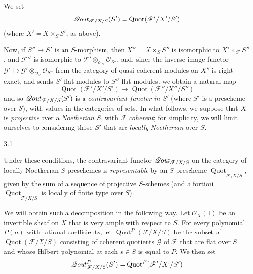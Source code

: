   We set
  \[     \mathscr {Q}\kern  -.75pt\mathit {out}_{{\mathscr {F}/X/S}} (S')     = \operatorname {Quot}({\mathscr {F}'/X'/S'})   \]
  (where \(X'=X\times _S S'\), as above).\par{}Now, if \(S''\to  S'\) is an \(S\)-morphism, then \(X''=X\times _S S''\) is isomorphic to \(X'\times _{S'}S''\), and \(\mathscr {F}''\) is isomorphic to \(\mathscr {F}'\otimes _{\mathcal {O}_{S'}}\mathcal {O}_{S''}\), and, since the inverse image functor \(\mathscr {G}'\mapsto \mathscr {G}'\otimes _{\mathcal {O}_{S'}}\mathcal {O}_{S''}\) from the category of quasi-coherent modules on \(X''\) is right exact, and sends \(S'\)-flat modules to \(S''\)-flat modules, we obtain a natural map
  \[     \operatorname {Quot}({\mathscr {F}'/X'/S'}) \to  \operatorname {Quot}(\mathscr {F}''/X''/S'')   \]
  and so \(\mathscr {Q}\kern  -.75pt\mathit {out}_{{\mathscr {F}/X/S}} (S')\) is a \emph{contravariant functor in \(S'\)} (where \(S'\) is a prescheme over \(S\)), with values in the categories of sets.
  In what follows, we suppose that \(X\) is \emph{projective} over a \emph{Noetherian} \(S\), with \(\mathscr {F}\) \emph{coherent};
  for simplicity, we will limit ourselves to considering those \(S'\) that are \emph{locally Noetherian} over \(S\).\begin{theorem}{3.1}\label{fga3.iv-3-theorem-3.1}\skipsinglepar\par{}Under these conditions, the contravariant functor \(\mathscr {Q}\kern  -.75pt\mathit {out}_{{\mathscr {F}/X/S}}\) on the category of locally Noetherian \(S\)-preschemes is \emph{representable} by an \(S\)-prescheme \(\underline {\operatorname {Quot}}_{{\mathscr {F}/X/S}}\), given by the sum of a sequence of projective \(S\)-schemes (and a fortiori \(\underline {\operatorname {Quot}}_{{\mathscr {F}/X/S}}\) is locally of finite type over \(S\)).\end{theorem}\par{}We will obtain such a decomposition in the following way.
  Let \(\mathcal {O}_X(1)\) be an invertible sheaf on \(X\) that is very ample with respect to \(S\).
  For every polynomial \(P(n)\) with rational coefficients, let \(\operatorname {Quot}^P({\mathscr {F}/X/S})\) be the subset of \(\operatorname {Quot}({\mathscr {F}/X/S})\) consisting of coherent quotients \(\mathscr {G}\) of \(\mathscr {F}\) that are flat over \(S\) and whose Hilbert polynomial at each \(s\in  S\) is equal to \(P\).
  We then set
  \[     \mathscr {Q}\kern  -.75pt\mathit {out}_{\mathscr {F}/X/S}^P(S')     = \operatorname {Quot}^P({\mathscr {F}'/X'/S'})   \]
